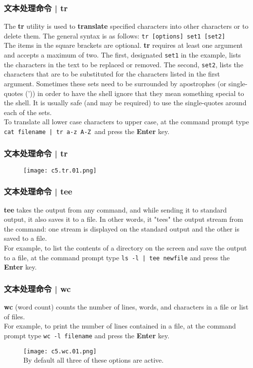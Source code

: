 \begin{frame}[fragile]
  \frametitle{文本处理命令 | tr}
  The \textbf{tr} utility is used to \textbf{translate} specified characters into other characters or to delete them. The general syntax is as follows: \verb|tr [options] set1 [set2]|\\
  \vspace{0.3cm}
  The items in the square brackets are optional. \textbf{tr} requires at least one argument and accepts a maximum of two. The first, designated \verb|set1| in the example, lists the characters in the text to be replaced or removed. The second, \verb|set2|, lists the characters that are to be substituted for the characters listed in the first argument. Sometimes these sets need to be surrounded by apostrophes (or single-quotes (')) in order to have the shell ignore that they mean something special to the shell. It is usually safe (and may be required) to use the single-quotes around each of the sets.\\
  \vspace{0.3cm}
  To translate all lower case characters to upper case, at the command prompt type \verb=cat filename | tr a-z A-Z =and press the \textbf{Enter} key.
\end{frame}

\begin{frame}
  \frametitle{文本处理命令 | tr}
  \begin{figure}
    \centering
    \texttt{[image: c5.tr.01.png]}
  \end{figure}
\end{frame}

\begin{frame}[fragile]
  \frametitle{文本处理命令 | tee}
  \textbf{tee} takes the output from any command, and while sending it to standard output, it also saves it to a file. In other words, it "tees" the output stream from the command: one stream is displayed on the standard output and the other is saved to a file.\\
  \vspace{0.3cm}
  For example, to list the contents of a directory on the screen and save the output to a file, at the command prompt type \verb=ls -l | tee newfile= and press the \textbf{Enter} key.
\end{frame}

\begin{frame}[fragile]
  \frametitle{文本处理命令 | wc}
  \textbf{wc} (word count) counts the number of lines, words, and characters in a file or list of files.\\
  \vspace{0.3cm}
  For example, to print the number of lines contained in a file, at the command prompt type \verb|wc -l filename| and press the \textbf{Enter} key.
  \begin{figure}
    \centering
    \texttt{[image: c5.wc.01.png]}\\
  By default all three of these options are active.
  \end{figure}
\end{frame}

